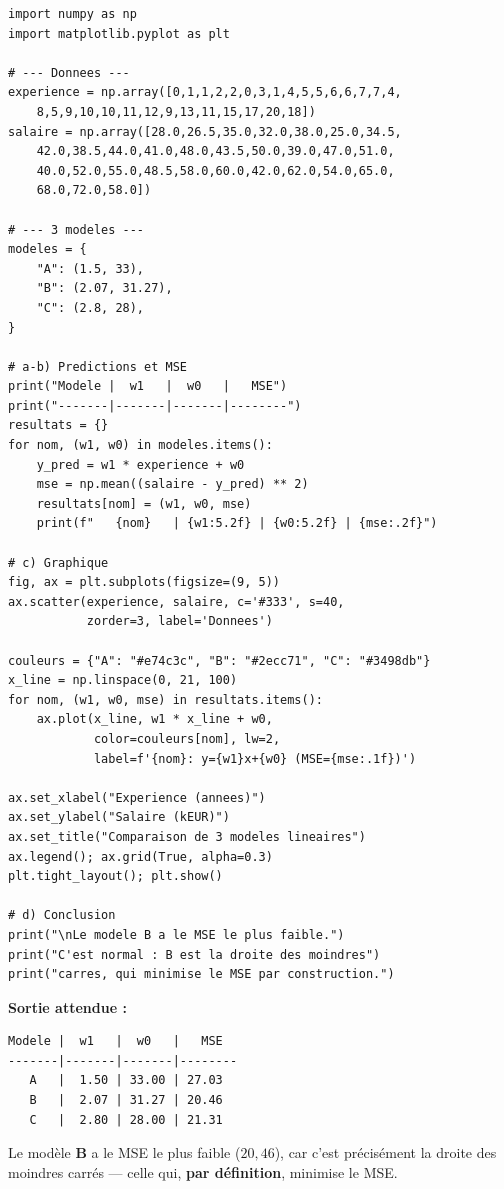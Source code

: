 \begin{pythonbox}
\begin{lstlisting}
import numpy as np
import matplotlib.pyplot as plt

# --- Donnees ---
experience = np.array([0,1,1,2,2,0,3,1,4,5,5,6,6,7,7,4,
    8,5,9,10,10,11,12,9,13,11,15,17,20,18])
salaire = np.array([28.0,26.5,35.0,32.0,38.0,25.0,34.5,
    42.0,38.5,44.0,41.0,48.0,43.5,50.0,39.0,47.0,51.0,
    40.0,52.0,55.0,48.5,58.0,60.0,42.0,62.0,54.0,65.0,
    68.0,72.0,58.0])

# --- 3 modeles ---
modeles = {
    "A": (1.5, 33),
    "B": (2.07, 31.27),
    "C": (2.8, 28),
}

# a-b) Predictions et MSE
print("Modele |  w1   |  w0   |   MSE")
print("-------|-------|-------|--------")
resultats = {}
for nom, (w1, w0) in modeles.items():
    y_pred = w1 * experience + w0
    mse = np.mean((salaire - y_pred) ** 2)
    resultats[nom] = (w1, w0, mse)
    print(f"   {nom}   | {w1:5.2f} | {w0:5.2f} | {mse:.2f}")

# c) Graphique
fig, ax = plt.subplots(figsize=(9, 5))
ax.scatter(experience, salaire, c='#333', s=40,
           zorder=3, label='Donnees')

couleurs = {"A": "#e74c3c", "B": "#2ecc71", "C": "#3498db"}
x_line = np.linspace(0, 21, 100)
for nom, (w1, w0, mse) in resultats.items():
    ax.plot(x_line, w1 * x_line + w0,
            color=couleurs[nom], lw=2,
            label=f'{nom}: y={w1}x+{w0} (MSE={mse:.1f})')

ax.set_xlabel("Experience (annees)")
ax.set_ylabel("Salaire (kEUR)")
ax.set_title("Comparaison de 3 modeles lineaires")
ax.legend(); ax.grid(True, alpha=0.3)
plt.tight_layout(); plt.show()

# d) Conclusion
print("\nLe modele B a le MSE le plus faible.")
print("C'est normal : B est la droite des moindres")
print("carres, qui minimise le MSE par construction.")
\end{lstlisting}
\end{pythonbox}

\textbf{Sortie attendue :}
\begin{verbatim}
Modele |  w1   |  w0   |   MSE
-------|-------|-------|--------
   A   |  1.50 | 33.00 | 27.03
   B   |  2.07 | 31.27 | 20.46
   C   |  2.80 | 28.00 | 21.31
\end{verbatim}

Le mod\`{e}le \textbf{B} a le MSE le plus faible ($20{,}46$), car c'est pr\'{e}cis\'{e}ment la droite
des moindres carr\'{e}s --- celle qui, \textbf{par d\'{e}finition}, minimise le MSE.

